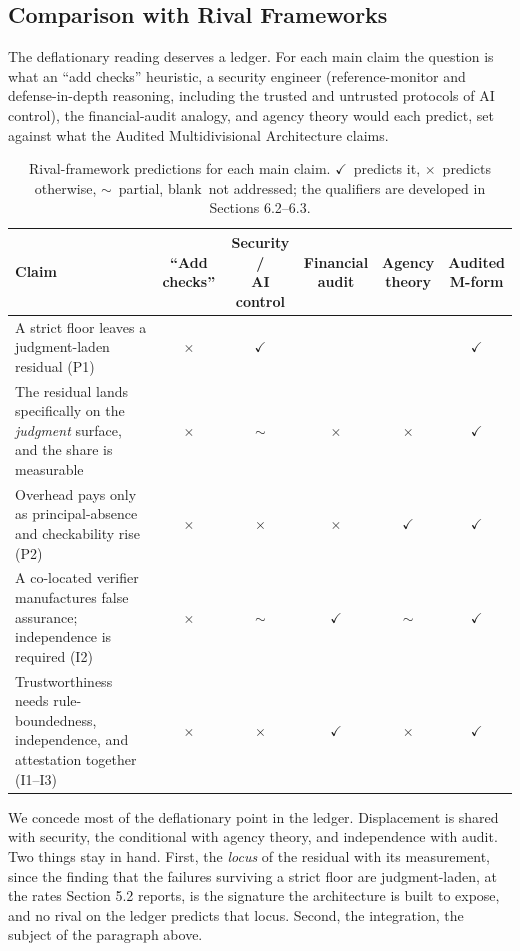 \documentclass[11pt]{article}
\begin{document}
\subsection{Comparison with Rival Frameworks}

The deflationary reading deserves a ledger. For each main claim the question is what an ``add checks'' heuristic, a security engineer (reference-monitor and defense-in-depth reasoning, including the trusted and untrusted protocols of AI control), the financial-audit analogy, and agency theory would each predict, set against what the Audited Multidivisional Architecture claims.

\begin{table}[ht]
\centering
\footnotesize
\setlength{\tabcolsep}{6pt}
\renewcommand{\arraystretch}{1.35}
\caption{Rival-framework predictions for each main claim. $\checkmark$~predicts it, $\times$~predicts otherwise, ${\sim}$~partial, blank~not addressed; the qualifiers are developed in Sections 6.2--6.3.}
\begin{tabular}{p{6.0cm}ccccc}
\toprule
Claim & ``Add checks'' & \shortstack{Security /\\ AI control} & \shortstack{Financial\\ audit} & \shortstack{Agency\\ theory} & \shortstack{Audited\\ M-form} \\
\midrule
A strict floor leaves a judgment-laden residual (P1) & $\times$ & $\checkmark$ & & & $\checkmark$ \\
The residual lands specifically on the \emph{judgment} surface, and the share is measurable & $\times$ & ${\sim}$ & $\times$ & $\times$ & $\checkmark$ \\
Overhead pays only as principal-absence and checkability rise (P2) & $\times$ & $\times$ & $\times$ & $\checkmark$ & $\checkmark$ \\
A co-located verifier manufactures false assurance; independence is required (I2) & $\times$ & ${\sim}$ & $\checkmark$ & ${\sim}$ & $\checkmark$ \\
Trustworthiness needs rule-boundedness, independence, and attestation together (I1--I3) & $\times$ & $\times$ & $\checkmark$ & $\times$ & $\checkmark$ \\
\bottomrule
\end{tabular}
\end{table}

We concede most of the deflationary point in the ledger. Displacement is shared with security, the conditional with agency theory, and independence with audit. Two things stay in hand. First, the \emph{locus} of the residual with its measurement, since the finding that the failures surviving a strict floor are judgment-laden, at the rates Section 5.2 reports, is the signature the architecture is built to expose, and no rival on the ledger predicts that locus. Second, the integration, the subject of the paragraph above.
\end{document}
